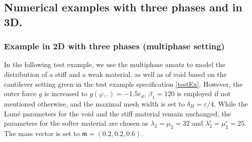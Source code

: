 \documentclass[a4paper,11pt]{article}
\theoremstyle{remark}
\begin{document}
\subsection{Numerical examples with three phases and in 3D.}
\subsubsection{Example in 2D with three phases (multiphase setting)}\label{Test2D3phase}
In the following test example, we use the multiphase ansatz to model the distribution of a stiff and a weak material, as well as of void based on the cantilever setting given in the test example specification \ref{testEx}. 
However, the outer force $g$ is increased to
$g(\varphi,.) = - 1.5  e_d$, 
$\beta_1=120$ is employed if not mentioned otherwise, and
the maximal mesh width is set to $\delta_H=\varepsilon /4 $. 
While the Lamé parameters for the void and the stiff material remain unchanged,
the parameters for the softer material are chosen as $\lambda_2=\mu_2=32$ and $\lambda_2^c=\mu_2^c=25$.
The mass vector is set to $\mathfrak{m}=(0.2,0.2,0.6)$.
\end{document}
